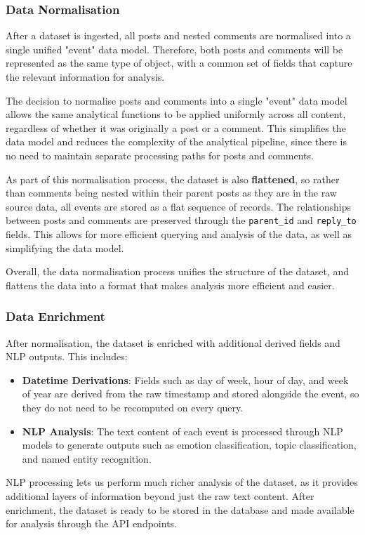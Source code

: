 \documentclass[12pt, a4paper]{article}
\begin{document}
\subsubsection{Data Normalisation}
After a dataset is ingested, all posts and nested comments are normalised into a single unified "event" data model. Therefore, both posts and comments will be represented as the same type of object, with a common set of fields that capture the relevant information for analysis. 

The decision to normalise posts and comments into a single "event" data model allows the same analytical functions to be applied uniformly across all content, regardless of whether it was originally a post or a comment. This simplifies the data model and reduces the complexity of the analytical pipeline, since there is no need to maintain separate processing paths for posts and comments.

As part of this normalisation process, the dataset is also \textbf{flattened}, so rather than comments being nested within their parent posts as they are in the raw source data, all events are stored as a flat sequence of records. The relationships between posts and comments are preserved through the \texttt{parent\_id} and \texttt{reply\_to} fields. This allows for more efficient querying and analysis of the data, as well as simplifying the data model.

Overall, the data normalisation process unifies the structure of the dataset, and flattens the data into a format that makes analysis more efficient and easier.

\subsubsection{Data Enrichment}
After normalisation, the dataset is enriched with additional derived fields and NLP outputs. This includes:
\begin{itemize}
    \item \textbf{Datetime Derivations}: Fields such as day of week, hour of day, and week of year are derived from the raw timestamp and stored alongside the event, so they do not need to be recomputed on every query.
    \item \textbf{NLP Analysis}: The text content of each event is processed through NLP models to generate outputs such as emotion classification, topic classification, and named entity recognition.
\end{itemize}

NLP processing lets us perform much richer analysis of the dataset, as it provides additional layers of information beyond just the raw text content. After enrichment, the dataset is ready to be stored in the database and made available for analysis through the API endpoints.
\end{document}
